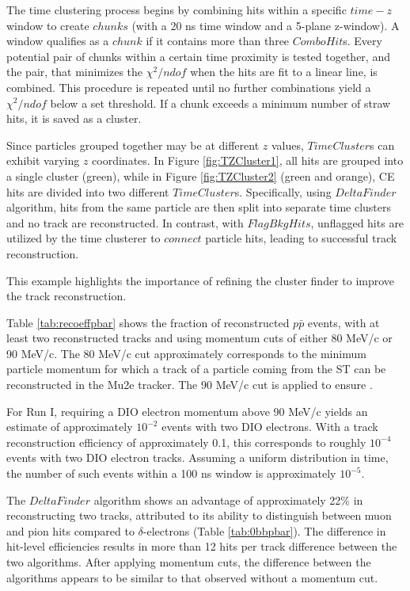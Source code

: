 The time clustering process begins 
by combining hits within a specific $time-z$ 
window to create $chunks$ (with a 
20 ns time window and a 5-plane z-window). 
A window qualifies as a $chunk$ if 
it contains more than three $ComboHit$s. 
Every potential pair of chunks 
within a certain time 
proximity is tested together, 
and the pair, that minimizes 
the $\chi^2/ndof$ when the hits 
are fit to a linear line, 
is combined. This procedure is 
repeated until no further combinations 
yield a $\chi^2/ndof$ below a set 
threshold. If a chunk 
exceeds a minimum number of straw 
hits, it is saved as a cluster.

Since particles grouped together 
may be at different $z$ values, 
$TimeCluster$s can exhibit varying 
$z$ coordinates. In Figure \ref{fig:TZCluster1}, 
all hits are grouped into a single cluster (green), 
while in Figure \ref{fig:TZCluster2} 
(green and orange), CE hits are divided into 
two different $TimeCluster$s.  
Specifically, using $DeltaFinder$ algorithm, hits from the same 
particle are then split into separate time clusters and no 
track are reconstructed. In contrast, 
with $FlagBkgHits$, unflagged hits are utilized by the 
time clusterer to $connect$ particle hits, 
leading to successful track reconstruction. 

This example highlights the importance of refining 
the cluster finder to improve the track reconstruction.


Table \ref{tab:recoeffpbar} shows the fraction of reconstructed $p\bar{p}$ events, 
with at least two reconstructed tracks and using momentum cuts of either 80 MeV/c or 90 MeV/c. The 80 
MeV/c cut approximately corresponds to the minimum particle momentum for which 
a track of a particle coming from the ST can be reconstructed 
in the Mu2e tracker. The 90 MeV/c cut 
is applied to ensure .

For Run I, requiring a 
DIO electron momentum above 90 MeV/c 
yields an estimate of 
approximately $10^{-2}$ events with 
two DIO electrons. With a 
track reconstruction efficiency of 
approximately 0.1, this corresponds 
to roughly $10^{-4}$ events with two 
DIO electron tracks. Assuming a 
uniform distribution in time, the number of such events within a 
100 ns window is approximately $10^{-5}$.

The $DeltaFinder$ algorithm shows  
an advantage of 
approximately 22\% in reconstructing 
two tracks, attributed to 
its ability to distinguish between 
muon and pion hits compared to 
$\delta$-electrons (Table \ref{tab:0bbpbar}). 
The difference in 
hit-level efficiencies results in more 
than 12 hits per track difference 
between the two algorithms. After 
applying momentum cuts, the 
difference between the algorithms 
appears to be similar to that 
observed without a momentum cut.


